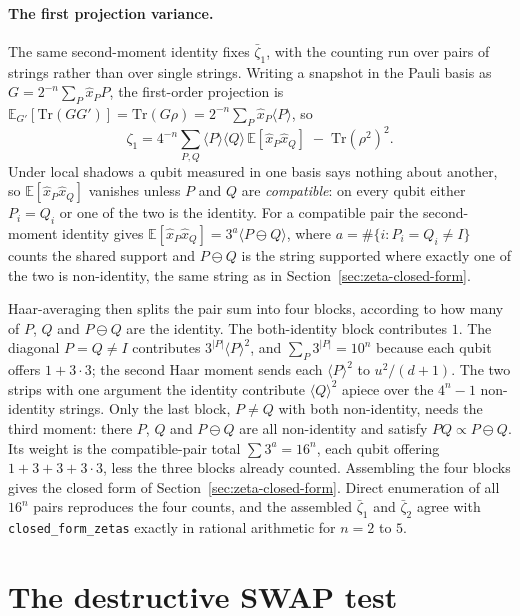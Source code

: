 \documentclass[a4paper,superscriptaddress,nofootinbib,onecolumn,nopdfoutputerror]{quantumarticle}
\begin{document}
\paragraph{The first projection variance.}
The same second-moment identity fixes \(\bar\zeta_1\), with the counting run
over pairs of strings rather than over single strings. Writing a snapshot in
the Pauli basis as \(G = 2^{-n}\sum_P \hat{x}_P P\), the first-order
projection is
\(\mathbb{E}_{G'}[\mathrm{Tr}(GG')] = \mathrm{Tr}(G\rho)
= 2^{-n}\sum_P \hat{x}_P \langle P\rangle\), so
\[\zeta_1 = 4^{-n}\sum_{P,Q}\langle P\rangle\langle Q\rangle\,
\mathbb{E}[\hat{x}_P\hat{x}_Q] \;-\; \mathrm{Tr}(\rho^2)^2 .\]
Under local shadows a qubit measured in one basis says nothing about another,
so \(\mathbb{E}[\hat{x}_P\hat{x}_Q]\) vanishes unless \(P\) and \(Q\) are
\emph{compatible}: on every qubit either \(P_i = Q_i\) or one of the two is
the identity. For a compatible pair the second-moment identity gives
\(\mathbb{E}[\hat{x}_P\hat{x}_Q] = 3^{a}\langle P \ominus Q\rangle\), where
\(a = \#\{i : P_i = Q_i \neq I\}\) counts the shared support and \(P \ominus Q\) is the
string supported where exactly one of the two is non-identity, the same string as in
Section~\ref{sec:zeta-closed-form}.

Haar-averaging then splits the pair sum into four blocks, according to how
many of \(P\), \(Q\) and \(P \ominus Q\) are the identity. The both-identity block contributes \(1\). The diagonal \(P = Q \neq I\) contributes
\(3^{|P|}\langle P\rangle^2\), and \(\sum_P 3^{|P|} = 10^n\) because each
qubit offers \(1 + 3\cdot 3\); the second Haar moment sends each
\(\langle P\rangle^2\) to \(u^2/(d+1)\). The two strips with one argument the
identity contribute \(\langle Q\rangle^2\) apiece over the \(4^n - 1\)
non-identity strings. Only the last block, \(P \neq Q\) with both
non-identity, needs the third moment: there \(P\), \(Q\) and
\(P \ominus Q\) are all non-identity and satisfy \(PQ \propto P \ominus Q\). Its weight is the compatible-pair total
\(\sum 3^{a} = 16^n\), each qubit offering \(1 + 3 + 3 + 3\cdot 3\), less the
three blocks already counted. Assembling the four blocks gives the closed
form of Section~\ref{sec:zeta-closed-form}. Direct enumeration of all
\(16^n\) pairs reproduces the four counts, and the assembled
\(\bar\zeta_1\) and \(\bar\zeta_2\) agree with
\texttt{closed\_form\_zetas} exactly in rational arithmetic for \(n = 2\)
to \(5\).

\hypertarget{appendix-b.-the-destructive-swap-test}{%
\section{The destructive SWAP
test}\label{appendix-b.-the-destructive-swap-test}}
\end{document}
